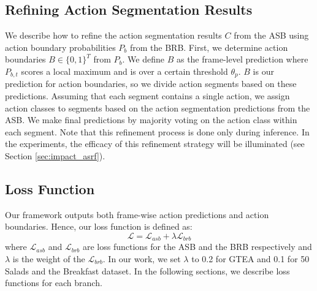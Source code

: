 \documentclass[10pt,twocolumn,letterpaper]{article}
\begin{document}
\subsection{Refining Action Segmentation Results}
\label{sec:refine}
We describe how to refine the action segmentation results $C$ from the ASB using action boundary probabilities $P_b$ from the BRB.
First, we determine action boundaries $B \in \{0, 1\}^T$ from $P_b$.
We define $B$ as the frame-level prediction where $P_{b,t}$ scores a local maximum and is over a certain threshold $\theta_p$.
$B$ is our prediction for action boundaries, so we divide action segments based on these predictions.
Assuming that each segment contains a single action, 
we assign action classes to segments based on the action segmentation predictions from the ASB.
We make final predictions by majority voting on the action class within each segment.
Note that this refinement process is done only during inference.
In the experiments, the efficacy of this refinement strategy will be illuminated (see Section \ref{sec:impact_asrf}).


\subsection{Loss Function}
\label{sec:loss}
Our framework outputs both frame-wise action predictions and action boundaries.
Hence, our loss function is defined as:
\begin{equation}
    \mathcal{L}=\mathcal{L}_{asb} + \lambda \mathcal{L}_{brb}
\end{equation}
where $\mathcal{L}_{asb}$ and $\mathcal{L}_{brb}$ are loss functions for the ASB and the BRB respectively
and $\lambda$ is the weight of the $\mathcal{L}_{brb}$.
In our work, we set $\lambda$ to 0.2 for GTEA and 0.1 for 50 Salads and the Breakfast dataset.
In the following sections, we describe loss functions for each branch. 
\end{document}
